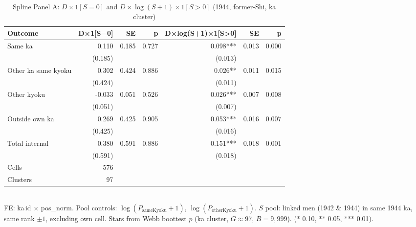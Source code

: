 \begin{table}[!htbp]
  \centering
  \caption{Spline Panel A: $D \times 1[S=0]$ and $D \times \log(S+1) \times 1[S>0]$ (1944, former-Shi, ka cluster)}
  \label{tab:spline_ka}
  \begin{tabular}{lrrrrrr}
    \hline\hline
    Outcome & D×1[S=0] & SE & p & D×log(S+1)×1[S>0] & SE & p \\
    \hline
    Same ka & 0.110 & 0.185 & 0.727 & 0.098*** & 0.013 & 0.000 \\
     & (0.185) &  &  & (0.013) &  &  \\
    Other ka same kyoku & 0.302 & 0.424 & 0.886 & 0.026** & 0.011 & 0.015 \\
     & (0.424) &  &  & (0.011) &  &  \\
    Other kyoku & -0.033 & 0.051 & 0.526 & 0.026*** & 0.007 & 0.008 \\
     & (0.051) &  &  & (0.007) &  &  \\
    Outside own ka & 0.269 & 0.425 & 0.905 & 0.053*** & 0.016 & 0.007 \\
     & (0.425) &  &  & (0.016) &  &  \\
    Total internal & 0.380 & 0.591 & 0.886 & 0.151*** & 0.018 & 0.001 \\
     & (0.591) &  &  & (0.018) &  &  \\
    \hline
    Cells & 576 &  &  &  &  &  \\
    Clusters & 97 &  &  &  &  &  \\
    \hline\hline
  \end{tabular}
  \\[4pt]
  \footnotesize
  FE: ka\,id $\times$ pos\_norm. Pool controls: $\log(P_{\text{sameKyoku}}+1)$, $\log(P_{\text{otherKyoku}}+1)$.
  $S$ pool: linked men (1942 \& 1944) in same 1944 ka, same rank $\pm 1$, excluding own cell.
  Stars from Webb boottest $p$ (ka cluster, $G \approx 97$, $B=9{,}999$). (* 0.10, ** 0.05, *** 0.01).
\end{table}
